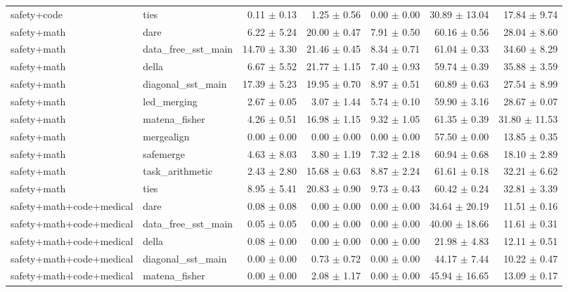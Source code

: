 \documentclass{article}
\begin{document}
\begin{table}[H]
{\begin{tabular}{llrrrrr}
safety+code & ties & 0.11 $\pm$ 0.13 & 1.25 $\pm$ 0.56 & 0.00 $\pm$ 0.00 & 30.89 $\pm$ 13.04 & 17.84 $\pm$ 9.74 \\
safety+math & dare & 6.22 $\pm$ 5.24 & 20.00 $\pm$ 0.47 & 7.91 $\pm$ 0.50 & 60.16 $\pm$ 0.56 & 28.04 $\pm$ 8.60 \\
safety+math & data\_free\_sst\_main & 14.70 $\pm$ 3.30 & 21.46 $\pm$ 0.45 & 8.34 $\pm$ 0.71 & 61.04 $\pm$ 0.33 & 34.60 $\pm$ 8.29 \\
safety+math & della & 6.67 $\pm$ 5.52 & 21.77 $\pm$ 1.15 & 7.40 $\pm$ 0.93 & 59.74 $\pm$ 0.39 & 35.88 $\pm$ 3.59 \\
safety+math & diagonal\_sst\_main & 17.39 $\pm$ 5.23 & 19.95 $\pm$ 0.70 & 8.97 $\pm$ 0.51 & 60.89 $\pm$ 0.63 & 27.54 $\pm$ 8.99 \\
safety+math & led\_merging & 2.67 $\pm$ 0.05 & 3.07 $\pm$ 1.44 & 5.74 $\pm$ 0.10 & 59.90 $\pm$ 3.16 & 28.67 $\pm$ 0.07 \\
safety+math & matena\_fisher & 4.26 $\pm$ 0.51 & 16.98 $\pm$ 1.15 & 9.32 $\pm$ 1.05 & 61.35 $\pm$ 0.39 & 31.80 $\pm$ 11.53 \\
safety+math & mergealign & 0.00 $\pm$ 0.00 & 0.00 $\pm$ 0.00 & 0.00 $\pm$ 0.00 & 57.50 $\pm$ 0.00 & 13.85 $\pm$ 0.35 \\
safety+math & safemerge & 4.63 $\pm$ 8.03 & 3.80 $\pm$ 1.19 & 7.32 $\pm$ 2.18 & 60.94 $\pm$ 0.68 & 18.10 $\pm$ 2.89 \\
safety+math & task\_arithmetic & 2.43 $\pm$ 2.80 & 15.68 $\pm$ 0.63 & 8.87 $\pm$ 2.24 & 61.61 $\pm$ 0.18 & 32.21 $\pm$ 6.62 \\
safety+math & ties & 8.95 $\pm$ 5.41 & 20.83 $\pm$ 0.90 & 9.73 $\pm$ 0.43 & 60.42 $\pm$ 0.24 & 32.81 $\pm$ 3.39 \\
safety+math+code+medical & dare & 0.08 $\pm$ 0.08 & 0.00 $\pm$ 0.00 & 0.00 $\pm$ 0.00 & 34.64 $\pm$ 20.19 & 11.51 $\pm$ 0.16 \\
safety+math+code+medical & data\_free\_sst\_main & 0.05 $\pm$ 0.05 & 0.00 $\pm$ 0.00 & 0.00 $\pm$ 0.00 & 40.00 $\pm$ 18.66 & 11.61 $\pm$ 0.31 \\
safety+math+code+medical & della & 0.08 $\pm$ 0.00 & 0.00 $\pm$ 0.00 & 0.00 $\pm$ 0.00 & 21.98 $\pm$ 4.83 & 12.11 $\pm$ 0.51 \\
safety+math+code+medical & diagonal\_sst\_main & 0.00 $\pm$ 0.00 & 0.73 $\pm$ 0.72 & 0.00 $\pm$ 0.00 & 44.17 $\pm$ 7.44 & 10.22 $\pm$ 0.47 \\
safety+math+code+medical & matena\_fisher & 0.00 $\pm$ 0.00 & 2.08 $\pm$ 1.17 & 0.00 $\pm$ 0.00 & 45.94 $\pm$ 16.65 & 13.09 $\pm$ 0.17 \\

\end{tabular}}
\end{table}
\end{document}
